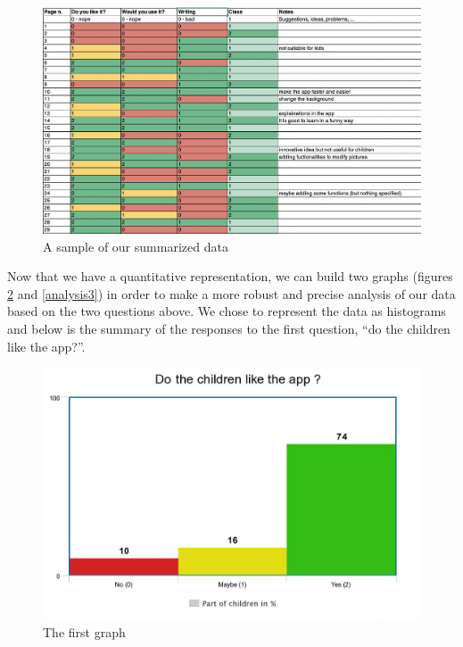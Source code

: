 \documentclass[12pt]{scrartcl}
\begin{document}
			\begin{figure}[H]
                        		\centering
               			\includegraphics[width=\textwidth]{../images/image_1_data_analysis.png}
               			\caption{A sample of our summarized data}
                        		\label{analysis1}
      			\end{figure}

			Now that we have a quantitative representation, we can build two graphs (figures \ref{analysis2} and \ref{analysis3}) in order to make a more robust and precise analysis of our data based on the two questions above. We chose to represent the data as histograms and below is the summary of the responses to the first question, “do the children like the app?”.

			\begin{figure}[H]
                        		\centering
               			\includegraphics[width=\textwidth]{../images/image_2_data_analysis.jpeg}
               			\caption{The first graph}
                        		\label{analysis2}
      			\end{figure}
\end{document}
